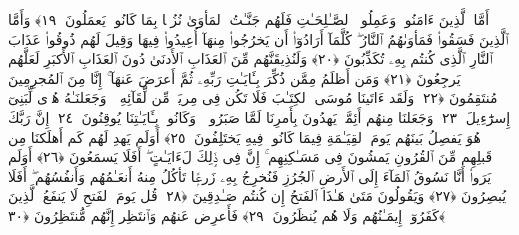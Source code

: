  أَمَّا ٱلَّذِينَ ءَامَنُوا۟ وَعَمِلُوا۟ ٱلصَّـٰلِحَـٰتِ فَلَهُم جَنَّـٰتُ ٱلمَأوَىٰ نُزُلًۢا بِمَا كَانُوا۟ يَعمَلُونَ ﴿١٩﴾
 وَأَمَّا ٱلَّذِينَ فَسَقُوا۟ فَمَأوَىٰهُمُ ٱلنَّارُ ۖ كُلَّمَآ أَرَادُوٓا۟ أَن يَخرُجُوا۟ مِنهَآ أُعِيدُوا۟ فِيهَا وَقِيلَ لَهُم ذُوقُوا۟ عَذَابَ ٱلنَّارِ ٱلَّذِى كُنتُم بِهِۦ تُكَذِّبُونَ ﴿٢٠﴾
 وَلَنُذِيقَنَّهُم مِّنَ ٱلعَذَابِ ٱلأَدنَىٰ دُونَ ٱلعَذَابِ ٱلأَكبَرِ لَعَلَّهُم يَرجِعُونَ ﴿٢١﴾
 وَمَن أَظلَمُ مِمَّن ذُكِّرَ بِـَٔايَـٰتِ رَبِّهِۦ ثُمَّ أَعرَضَ عَنهَآ ۚ إِنَّا مِنَ ٱلمُجرِمِينَ مُنتَقِمُونَ ﴿٢٢﴾
 وَلَقَد ءَاتَينَا مُوسَى ٱلكِتَـٰبَ فَلَا تَكُن فِى مِريَةٍۢ مِّن لِّقَآئِهِۦ ۖ وَجَعَلنَـٰهُ هُدًۭى لِّبَنِىٓ إِسرَٰٓءِيلَ ﴿٢٣﴾
 وَجَعَلنَا مِنهُم أَئِمَّةًۭ يَهدُونَ بِأَمرِنَا لَمَّا صَبَرُوا۟ ۖ وَكَانُوا۟ بِـَٔايَـٰتِنَا يُوقِنُونَ ﴿٢٤﴾
 إِنَّ رَبَّكَ هُوَ يَفصِلُ بَينَهُم يَومَ ٱلقِيَـٰمَةِ فِيمَا كَانُوا۟ فِيهِ يَختَلِفُونَ ﴿٢٥﴾
 أَوَلَم يَهدِ لَهُم كَم أَهلَكنَا مِن قَبلِهِم مِّنَ ٱلقُرُونِ يَمشُونَ فِى مَسَـٰكِنِهِم ۚ إِنَّ فِى ذَٟلِكَ لَءَايَـٰتٍ ۖ أَفَلَا يَسمَعُونَ ﴿٢٦﴾
 أَوَلَم يَرَوا۟ أَنَّا نَسُوقُ ٱلمَآءَ إِلَى ٱلأَرضِ ٱلجُرُزِ فَنُخرِجُ بِهِۦ زَرعًۭا تَأكُلُ مِنهُ أَنعَـٰمُهُم وَأَنفُسُهُم ۖ أَفَلَا يُبصِرُونَ ﴿٢٧﴾
 وَيَقُولُونَ مَتَىٰ هَـٰذَا ٱلفَتحُ إِن كُنتُم صَـٰدِقِينَ ﴿٢٨﴾
 قُل يَومَ ٱلفَتحِ لَا يَنفَعُ ٱلَّذِينَ كَفَرُوٓا۟ إِيمَـٰنُهُم وَلَا هُم يُنظَرُونَ ﴿٢٩﴾
 فَأَعرِض عَنهُم وَٱنتَظِر إِنَّهُم مُّنتَظِرُونَ ﴿٣٠﴾
 
